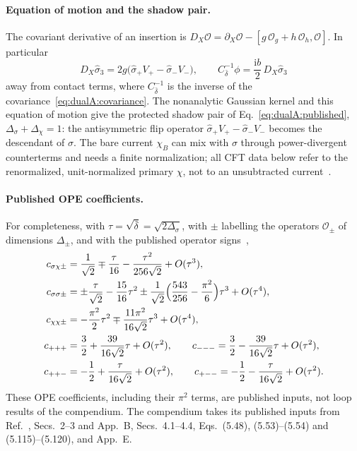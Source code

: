 \documentclass[11pt,a4paper]{article}
\numberwithin{equation}{section}
\newcommand{\Ds}{\Delta_\sigma}
\newcommand{\db}{\bar\delta}
\newcommand{\Og}{\mathcal O_g}
\newcommand{\Oh}{\mathcal O_h}
\begin{document}
\paragraph{Equation of motion and the shadow pair.} The covariant derivative of an insertion is
$D_X\mathcal O=\partial_X\mathcal O-[g\,\Og+h\,\Oh,\mathcal O]$. In particular
\begin{equation}
 D_X\hat\sigma_3=2g\bigl(\hat\sigma_+V_+-\hat\sigma_-V_-\bigr),\qquad
 C_{\db}^{-1}\phi=\frac{\mathrm ib}{2}\,D_X\hat\sigma_3
 \label{eq:dualA:eom}
\end{equation}
away from contact terms, where $C_{\db}^{-1}$ is the inverse of the covariance~\eqref{eq:dualA:covariance}. The
nonanalytic Gaussian kernel and this equation of motion give the protected shadow pair of
Eq.~\eqref{eq:dualA:published}, $\Ds+\Delta_\chi=1$: the antisymmetric flip operator
$\hat\sigma_+V_+-\hat\sigma_-V_-$ becomes the descendant of $\sigma$. The bare current $\chi_B$ can mix with $\sigma$
through power-divergent counterterms and needs a finite normalization; all CFT data below refer to the renormalized,
unit-normalized primary $\chi$, not to an unsubtracted current~\cite{Benedetti:2025nzp}.

\paragraph{Published OPE coefficients.} For completeness, with $\tau=\sqrt{\db}=\sqrt{2\Ds}$, with $\pm$ labelling the
operators $\mathcal O_\pm$ of dimensions $\Delta_\pm$, and with the published operator
signs~\cite[eqs.~(5.115) and (5.120)]{Benedetti:2025nzp},
\begin{equation}
\begin{aligned}
 c_{\sigma\chi\pm}&=\frac1{\sqrt2}\mp\frac{\tau}{16}-\frac{\tau^2}{256\sqrt2}+O(\tau^3),\\
 c_{\sigma\sigma\pm}&=\pm\frac{\tau}{\sqrt2}-\frac{15}{16}\tau^2
 \pm\frac1{\sqrt2}\Bigl(\frac{543}{256}-\frac{\pi^2}{6}\Bigr)\tau^3+O(\tau^4),\\
 c_{\chi\chi\pm}&=-\frac{\pi^2}{2}\tau^2\mp\frac{11\pi^2}{16\sqrt2}\tau^3+O(\tau^4),\\
 c_{+++}&=\frac32+\frac{39}{16\sqrt2}\tau+O(\tau^2),\qquad
 c_{---}=\frac32-\frac{39}{16\sqrt2}\tau+O(\tau^2),\\
 c_{++-}&=-\frac12+\frac{\tau}{16\sqrt2}+O(\tau^2),\qquad
 c_{+--}=-\frac12-\frac{\tau}{16\sqrt2}+O(\tau^2).
\end{aligned}
\label{eq:dualA:ope}
\end{equation}
These OPE coefficients, including their $\pi^2$ terms, are published inputs, not loop results of the compendium.
The compendium takes its published inputs from Ref.~\cite{Benedetti:2025nzp}, Secs.~2--3 and App.~B, Secs.~4.1--4.4,
Eqs.~(5.48), (5.53)--(5.54) and (5.115)--(5.120), and App.~E.
\end{document}
